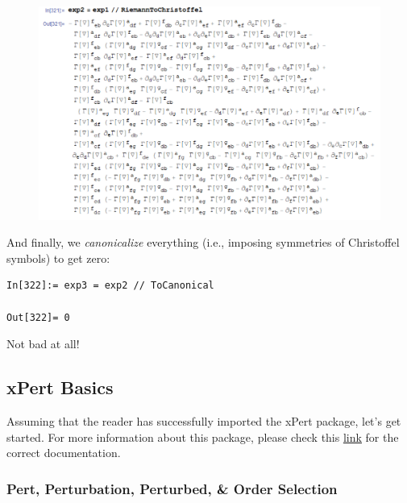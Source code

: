 \documentclass{book}
\theoremstyle{definition}
\begin{document}
\begin{figure}[!htb]
	\includegraphics[scale=0.2]{rietochris}
\end{figure}

And finally, we \textit{canonicalize} everything (i.e., imposing symmetries of Christoffel symbols) to get zero:
\begin{lstlisting}
In[322]:= exp3 = exp2 // ToCanonical

Out[322]= 0
\end{lstlisting}

Not bad at all!























\newpage



\subsection{xPert Basics}






Assuming that the reader has successfully imported the xPert package, let's get started. For more information about this package, please check this \href{http://www.xact.es/Documentation/HTML/HTMLLinks/}{\underline{link}} for the correct documentation.


\subsubsection{Pert, Perturbation, Perturbed, \& Order Selection}
\end{document}
